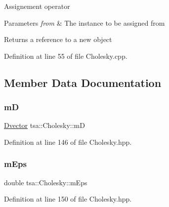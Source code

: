 Assignement operator


\begin{DoxyParams}{Parameters}
{\em from} & The instance to be assigned from\\
\hline
\end{DoxyParams}
\begin{DoxyReturn}{Returns}
a reference to a new object 
\end{DoxyReturn}


Definition at line 55 of file Cholesky.\+cpp.



\subsection{Member Data Documentation}
\mbox{\label{classtsa_1_1_cholesky_afb8463f2c148c8ae2ef2c2914074718a}} 
\subsubsection{\texorpdfstring{mD}{mD}}
{\footnotesize\ttfamily \hyperlink{namespacetsa_a8900fb03d849baf447a1a0efe2561fb2}{Dvector} tsa\+::\+Cholesky\+::mD\hspace{0.3cm}{\ttfamily [private]}}



Definition at line 146 of file Cholesky.\+hpp.

\mbox{\label{classtsa_1_1_cholesky_aa49812e981a177f6792389d0d760db52}} 
\subsubsection{\texorpdfstring{m\+Eps}{mEps}}
{\footnotesize\ttfamily double tsa\+::\+Cholesky\+::m\+Eps\hspace{0.3cm}{\ttfamily [private]}}



Definition at line 150 of file Cholesky.\+hpp.

\mbox{\label{classtsa_1_1_cholesky_afc88d4ebf8b5a163a77ef3e3dd90f99d}} 
